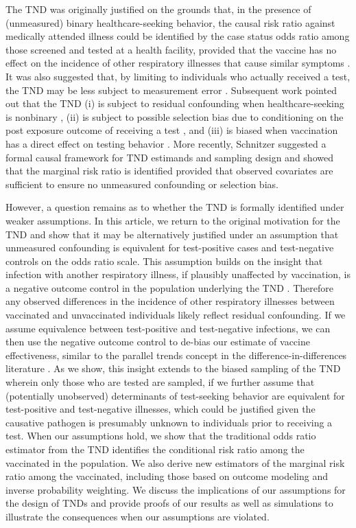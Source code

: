 \documentclass[11pt]{article}
\begin{document}
The TND was originally justified on the grounds that, in the presence of (unmeasured) binary healthcare-seeking behavior, the causal risk ratio against medically attended illness could be identified by the case status odds ratio among those screened and tested at a health facility, provided that the vaccine has no effect on the incidence of other respiratory illnesses that cause similar symptoms \cite{jackson_test-negative_2013}. It was also suggested that, by limiting to individuals who actually received a test, the TND may be less subject to measurement error \cite{jackson_test-negative_2013}. Subsequent work pointed out that the TND (i) is subject to residual confounding when healthcare-seeking is nonbinary \cite{sullivan_theoretical_2016,lewnard_theoretical_2021}, (ii) is subject to possible selection bias due to conditioning on the post exposure outcome of receiving a test \cite{sullivan_theoretical_2016}, and (iii) is biased when vaccination has a direct effect on testing behavior \cite{foppa_case_2013}. More recently, Schnitzer \cite{schnitzer_estimands_2022} suggested a formal causal framework for TND estimands and sampling design and showed that the marginal risk ratio is identified provided that observed covariates are sufficient to ensure no unmeasured confounding or selection bias. 

However, a question remains as to whether the TND is formally identified under weaker assumptions. In this article, we return to the original motivation for the TND and show that it may be alternatively justified under an assumption that unmeasured confounding is equivalent for test-positive cases and test-negative controls on the odds ratio scale. This assumption builds on the insight that infection with another respiratory illness, if plausibly unaffected by vaccination, is a negative outcome control in the population underlying the TND \cite{lipsitch_negative_2010,shi_selective_2020}. Therefore any observed differences in the incidence of other respiratory illnesses between vaccinated and unvaccinated individuals likely reflect residual confounding. If we assume equivalence between test-positive and test-negative infections, we can then use the negative outcome control to de-bias our estimate of vaccine effectiveness, similar to the parallel trends concept in the difference-in-differences literature \cite{sofer_negative_2016,park_universal_2023,tchetgen_universal_2023}. As we show, this insight extends to the biased sampling of the TND wherein only those who are tested are sampled, if we further assume that (potentially unobserved) determinants of test-seeking behavior are equivalent for test-positive and test-negative illnesses, which could be justified given the causative pathogen is presumably unknown to individuals prior to receiving a test. When our assumptions hold, we show that the traditional odds ratio estimator from the TND identifies the conditional risk ratio among the vaccinated in the population. We also derive new estimators of the marginal risk ratio among the vaccinated, including those based on outcome modeling and inverse probability weighting. We discuss the implications of our assumptions for the design of TNDs and provide proofs of our results as well as simulations to illustrate the consequences when our assumptions are violated.
\end{document}
